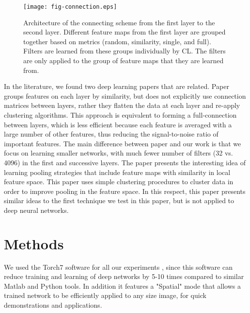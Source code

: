 \documentclass{article} %
\begin{document}
\begin{figure}
\texttt{[image: fig-connection.eps]}
\caption{Architecture of the connecting scheme from the first layer to the second layer. 
Different feature maps from the first layer are grouped together based on metrics (random, similarity, single, and full). 
Filters are learned from these groups individually by CL.
The filters are only applied to the group of feature maps that they are learned from.}
\label{fig-learnlayers}
\end{figure}

In the literature, we found two deep learning papers that are related. 
Paper \cite{coates2012learning} groups features on each layer by similarity, but does not explicitly use connection matrices between layers, 
rather they flatten the data at each layer and re-apply clustering algorithms. 
This approach is equivalent to forming a full-connection between layers, 
which is less efficient because each feature is averaged with a large number of other features, thus reducing the signal-to-noise ratio of important features.
The main difference between paper \cite{coates2012learning} and our work is that we focus on learning smaller networks,
with much fewer number of filters (32 vs. 4096) in the first and successive layers. 
The paper \cite{boureau_2011} presents the interesting idea of learning pooling strategies that include feature maps with similarity in local feature space. 
This paper uses simple clustering procedures to cluster data in order to improve pooling in the feature space. 
In this respect, this paper presents similar ideas to the first technique we test in this paper, but is not applied to deep neural networks.



\section{Methods}
\label{sec-methods}


We used the Torch7 software for all our experiments \cite{collobert_torch7_2011}, since this software can reduce training and learning of deep networks
by 5-10 times compared to similar Matlab and Python tools.
In addition it features a "Spatial" mode that allows a trained network to be efficiently applied to any size image, for quick demonstrations and applications.
\end{document}
